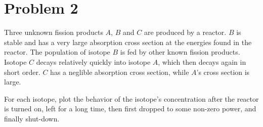 \documentclass{report}
\begin{document}
\newpage
\section*{Problem 2}

Three unknown fission products $A$, $B$ and $C$ are produced by a reactor. $B$ is stable and has a very large absorption cross section at the energies found in the reactor. The population of isotope $B$ is fed by other known fission products. Isotope $C$ decays relatively quickly into isotope $A$, which then decays again in short order. $C$ has a neglible absorption cross section, while $A$'s cross section is large. 

For each isotope, plot the behavior of the isotope's concentration after the reactor is turned on, left for a long time, then first dropped to some non-zero power, and finally shut-down.
\end{document}
